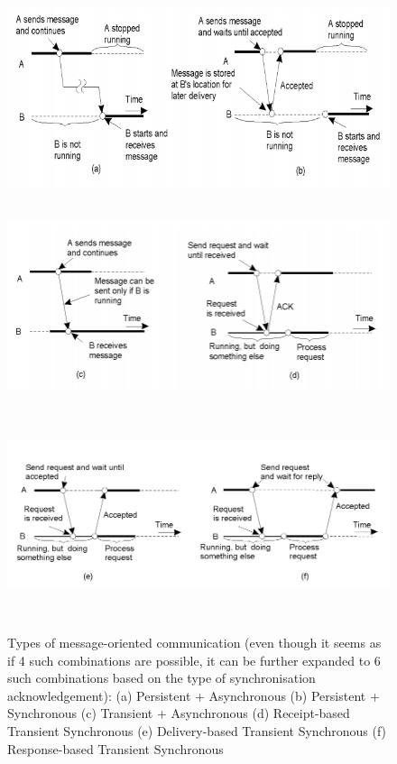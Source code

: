 \documentclass[twoside]{article}
\begin{document}
\begin{figure}
\includegraphics[width=15cm, height=6cm]{Selection_001}
\includegraphics[width=15cm, height=6cm]{Selection_002}
\includegraphics[width=15cm, height=6cm]{Selection_003}
\centering
\caption{Types of message-oriented communication (even though it seems as if 4 such combinations are possible, it can be further expanded to 6 such combinations based on the type of synchronisation acknowledgement): (a) Persistent + Asynchronous (b) Persistent + Synchronous (c) Transient + Asynchronous (d) Receipt-based Transient Synchronous (e) Delivery-based Transient Synchronous (f) Response-based Transient Synchronous}
\end{figure}
\end{document}
